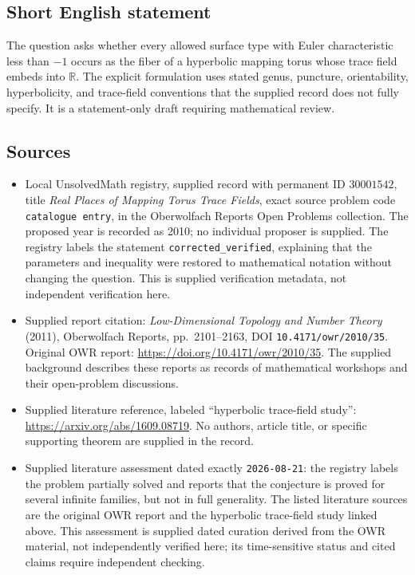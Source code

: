 \documentclass[11pt]{article}
\newcommand{\R}{\mathbb{R}}
\begin{document}
\subsection{Short English statement}
The question asks whether every allowed surface type with Euler characteristic less than \(-1\) occurs as the fiber of a hyperbolic mapping torus whose trace field embeds into \(\R\). The explicit formulation uses stated genus, puncture, orientability, hyperbolicity, and trace-field conventions that the supplied record does not fully specify. It is a statement-only draft requiring mathematical review.
\subsection{Sources}
\begin{itemize}
\item Local UnsolvedMath registry, supplied record with permanent ID \(30001542\), title \emph{Real Places of Mapping Torus Trace Fields}, exact source problem code \texttt{catalogue entry}, in the Oberwolfach Reports Open Problems collection. The proposed year is recorded as 2010; no individual proposer is supplied. The registry labels the statement \texttt{corrected\_verified}, explaining that the parameters and inequality were restored to mathematical notation without changing the question. This is supplied verification metadata, not independent verification here.
\item Supplied report citation: \emph{Low-Dimensional Topology and Number Theory} (2011), Oberwolfach Reports, pp.\ 2101--2163, DOI \texttt{10.4171/owr/2010/35}. Original OWR report: \url{https://doi.org/10.4171/owr/2010/35}. The supplied background describes these reports as records of mathematical workshops and their open-problem discussions.
\item Supplied literature reference, labeled ``hyperbolic trace-field study'': \url{https://arxiv.org/abs/1609.08719}. No authors, article title, or specific supporting theorem are supplied in the record.
\item Supplied literature assessment dated exactly \texttt{2026-08-21}: the registry labels the problem partially solved and reports that the conjecture is proved for several infinite families, but not in full generality. The listed literature sources are the original OWR report and the hyperbolic trace-field study linked above. This assessment is supplied dated curation derived from the OWR material, not independently verified here; its time-sensitive status and cited claims require independent checking.
\end{itemize}
\end{document}
